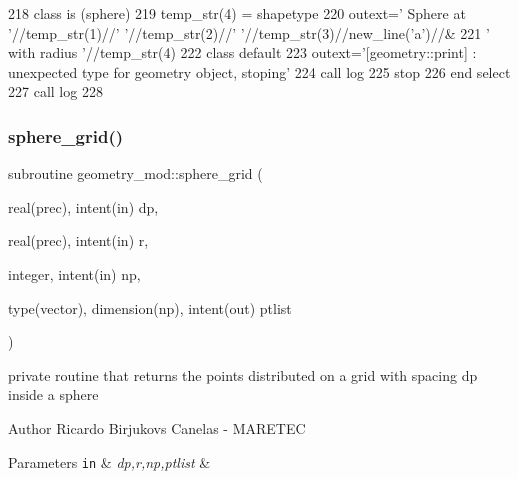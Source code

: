 \begin{DoxyCode}
218 \textcolor{keywordflow}{    class is} (sphere)
219         temp\_str(4) = shapetype%
220         outext=\textcolor{stringliteral}{'      Sphere at '}//temp\_str(1)//\textcolor{stringliteral}{' '}//temp\_str(2)//\textcolor{stringliteral}{' '}//temp\_str(3)//new\_line(\textcolor{stringliteral}{'a'})//&
221                \textcolor{stringliteral}{'       with radius '}//temp\_str(4)        
222 \textcolor{keywordflow}{        class default}
223         outext=\textcolor{stringliteral}{'[geometry::print] : unexpected type for geometry object, stoping'}
224         \textcolor{keyword}{call }log%
225         stop
226 \textcolor{keywordflow}{    end select}
227     \textcolor{keyword}{call }log%
228 
\end{DoxyCode}
\mbox{\label{namespacegeometry__mod_a6c03a4ea3de6763940396dbeb3908ebc}} 
\subsubsection{\texorpdfstring{sphere\+\_\+grid()}{sphere\_grid()}}
{\footnotesize\ttfamily subroutine geometry\+\_\+mod\+::sphere\+\_\+grid (\begin{DoxyParamCaption}\item[{real(prec), intent(in)}]{dp,  }\item[{real(prec), intent(in)}]{r,  }\item[{integer, intent(in)}]{np,  }\item[{type(vector), dimension(np), intent(out)}]{ptlist }\end{DoxyParamCaption})\hspace{0.3cm}{\ttfamily [private]}}



private routine that returns the points distributed on a grid with spacing dp inside a sphere 

\begin{DoxyAuthor}{Author}
Ricardo Birjukovs Canelas -\/ M\+A\+R\+E\+T\+EC
\end{DoxyAuthor}

\begin{DoxyParams}[1]{Parameters}
\mbox{\tt in}  & {\em dp,r,np,ptlist} & \\
\hline
\end{DoxyParams}


